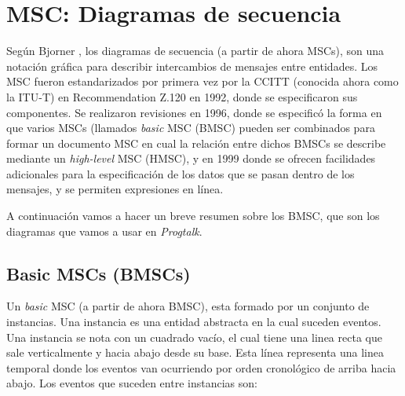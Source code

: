 \documentclass[12pt,a4paper]{report}
\begin{document}
\chapter{MSC: Diagramas de secuencia}

Según Bjorner \cite{Bjorner}, los diagramas de secuencia (a partir de ahora MSCs), son una notación gráfica para describir intercambios de mensajes entre entidades. Los MSC fueron estandarizados por primera vez por la CCITT (conocida ahora como la ITU-T) en Recommendation Z.120 en 1992, donde se especificaron sus componentes. Se realizaron revisiones en 1996, donde se especificó la forma en que varios MSCs (llamados \textit{basic} MSC (BMSC) pueden ser combinados para formar un documento MSC en cual la relación entre dichos BMSCs se describe mediante un \textit{high-level} MSC (HMSC), y en 1999 donde se ofrecen facilidades adicionales para la especificación de los datos que se pasan dentro de los mensajes, y se permiten expresiones en línea.

A continuación vamos a hacer un breve resumen sobre los BMSC, que son los diagramas que vamos a usar en \textit{Progtalk}.

\section{Basic MSCs (BMSCs)}
Un \textit{basic} MSC (a partir de ahora BMSC), esta formado por un conjunto de instancias. Una instancia es una entidad abstracta en la cual suceden eventos. Una instancia se nota con un cuadrado vacío, el cual tiene una linea recta que sale verticalmente y hacia abajo desde su base. Esta línea representa una linea temporal donde los eventos van ocurriendo por orden cronológico de arriba hacia abajo. Los eventos que suceden entre instancias son:
\end{document}
